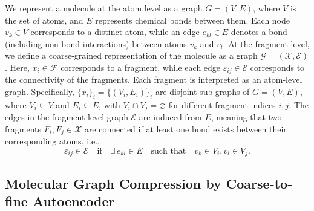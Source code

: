 We represent a molecule at the atom level as a graph  $G = (V, E)$, where  $V$ is the set of atoms, and $E$ represents chemical bonds between them. 
Each node $v_k \in V$ corresponds to a distinct atom, while an edge $e_{kl} \in E$ denotes a bond (including non-bond interactions) between atoms $v_k$ and $v_l$.
At the fragment level, we define a coarse-grained representation of the molecule as a graph $\mathcal{G}=(\mathcal{X}, \mathcal{E})$.
Here, $x_i \in \mathcal{F}$ corresponds to a fragment, while each edge $\varepsilon_{ij} \in \mathcal{E}$ corresponds to the connectivity of the fragments.
Each fragment is interpreted as an atom-level graph.
Specifically, $\{x_i\}_i = \{(V_{i}, E_{i})\}_{i}$ are disjoint sub-graphs of $G=(V, E)$, where $V_{i} \subseteq V$ and $E_{i} \subseteq E$, with $V_i\cap V_j =\varnothing$ for different fragment indices $i, j$.
The edges in the fragment-level graph $\mathcal{E}$ are induced from $E$, meaning that two fragments $F_i, F_j \in \mathcal{X}$ are connected if at least one bond exists between their corresponding atoms, i.e.,
\begin{equation} \label{eq:definition of frag edge}
    \varepsilon_{ij}\in \mathcal{E} \quad \text{if} \quad \exists \, e_{kl} \in E \quad \text{such that} \quad v_k \in V_{i}, v_l \in V_{j}.
\end{equation}


\subsection{Molecular Graph Compression by Coarse-to-fine Autoencoder}
\label{subsec:molecular_graph_compression_by_coarse_to_fine_autoencoder}

